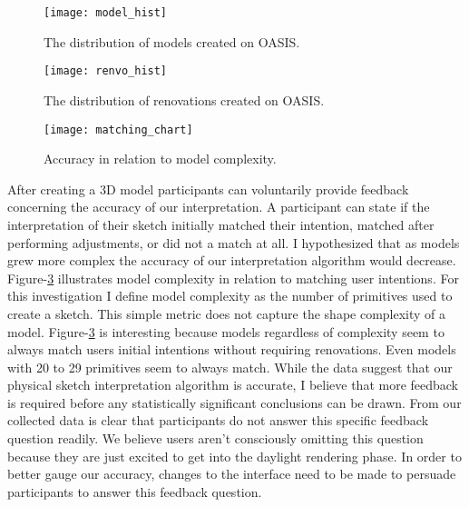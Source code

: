 \begin{figure}[!ht]
	\centering
	\caption{The distribution of models created on OASIS.}
	\label{fig:model_hist}
	\texttt{[image: model\_hist]}
\end{figure}


\begin{figure}[!ht]
	\centering
	\caption{The distribution of renovations created on OASIS.}
	\label{fig:renvo_hist}
	\texttt{[image: renvo\_hist]}
\end{figure}


\begin{figure}[!ht]
	\centering
	\caption{Accuracy in relation to model complexity.}
	\label{fig:matching_chart}
	\texttt{[image: matching\_chart]}
\end{figure}

After creating a 3D model participants can voluntarily provide feedback concerning the accuracy of our interpretation.
A participant can state if the  interpretation of their sketch initially matched their intention,  matched after performing adjustments, or did not a match at all.
I hypothesized that as models grew more complex the accuracy of our interpretation algorithm would decrease.
Figure-\ref{fig:matching_chart} illustrates model complexity in relation to matching user intentions.
For this investigation I define model complexity as the number of primitives used to create a sketch. This simple metric does not capture the shape complexity of a model.
Figure-\ref{fig:matching_chart} is interesting because models regardless of complexity seem to always match users initial intentions without requiring renovations.
Even models with 20 to 29 primitives seem to always match.
While the data suggest that our physical sketch interpretation algorithm is accurate, I believe that more feedback is required before any statistically significant conclusions can be drawn.
From our collected data is clear that participants do not answer this specific feedback question readily.
We believe users aren't consciously omitting this question because they are just excited to get into the daylight rendering phase.
In order to better gauge our accuracy, changes to the interface need to be made to persuade participants to answer this feedback question. \\




